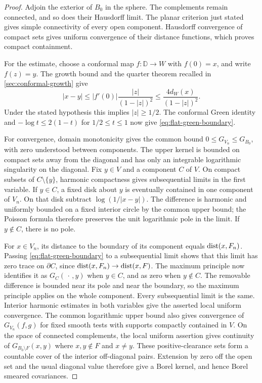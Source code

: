 \begin{proof}
Adjoin the exterior of \(B_0\) in the sphere. The complements remain
connected, and so does their Hausdorff limit. The planar criterion just
stated gives simple connectivity of every open component. Hausdorff
convergence of compact sets gives uniform convergence of their distance
functions, which proves compact containment.

For the estimate, choose a conformal map \(f:\mathbb D\to W\) with
\(f(0)=x\), and write \(f(z)=y\). The growth bound and the quarter theorem
recalled in \cref{sec:conformal-growth} give
\[
 |x-y|\le |f'(0)|\frac{|z|}{(1-|z|)^2}
          \le \frac{4d_W(x)}{(1-|z|)^2}.
\]
Under the stated hypothesis this implies \(|z|\ge1/2\). The conformal
Green identity and \(-\log t\le2(1-t)\) for \(1/2\le t\le1\) now give
\cref{eq:flat-green-boundary}.

For convergence, domain monotonicity gives the common bound
\(0\le G_{V_n}\le G_{B_0}\), with zero understood between components.
The upper kernel is bounded on compact sets away from the diagonal and
has only an integrable logarithmic singularity on the diagonal. Fix \(y\in V\) and a
component \(C\) of \(V\). On compact subsets of \(C\setminus\{y\}\),
harmonic compactness gives subsequential limits in the first variable.
If \(y\in C\), a fixed disk about \(y\) is eventually contained in one
component of \(V_n\). On that disk subtract \(\log(1/|x-y|)\).
The difference is harmonic and uniformly bounded on a fixed interior
circle by the common upper bound; the Poisson formula therefore preserves
the unit logarithmic pole in the limit. If \(y\notin C\), there is no pole.

For \(x\in V_n\), its distance to the boundary of its component equals
\(\operatorname{dist}(x,F_n)\). Passing \cref{eq:flat-green-boundary} to a subsequential
limit shows that this limit has zero trace on \(\partial C\), since
\(\operatorname{dist}(x,F_n)\to\operatorname{dist}(x,F)\). The maximum principle now identifies it
as \(G_C(\,\cdot\,,y)\) when \(y\in C\), and as zero when \(y\notin C\).
The removable difference is bounded near its pole and near the boundary,
so the maximum principle applies on the whole component. Every
subsequential limit is the same. Interior harmonic estimates in both
variables give the asserted local uniform convergence. The common
logarithmic upper bound also gives convergence of \(G_{V_n}(f,g)\) for
fixed smooth tests with supports compactly contained in \(V\).
On the space of connected complements, the local uniform assertion gives
continuity of \(G_{B_0\setminus F}(x,y)\) where \(x,y\notin F\) and \(x\ne y\).
These positive-clearance sets form a countable cover of the interior
off-diagonal pairs. Extension by zero off the open set and the usual
diagonal value therefore give a Borel kernel, and hence Borel smeared
covariances.
\end{proof}

